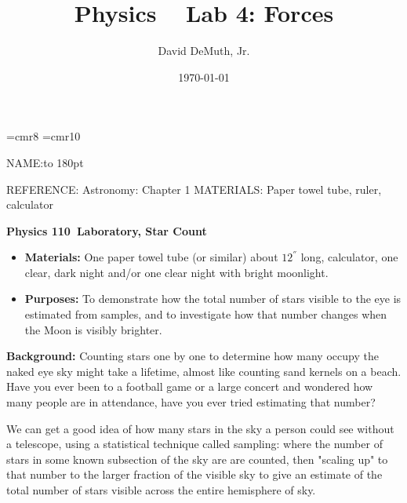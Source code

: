 \documentclass{article}
\title{\Huge Physics \courseno~ Lab 4: Forces}
\author{\Huge David DeMuth, Jr.}
\date{\today}
\def \courseno {110}
\begin{document}
\newcommand{\heading}[1]{{\boldbigtenrm #1}}
\newcommand{\subheading}[1]{{\boldtenrm #1}}
\newcommand{\referencepages}[1]{\vskip -25pt{\eightrm REFERENCE: #1}}
\newcommand{\materials}[1]{\vskip -15pt{\eightrm MATERIALS: #1}}
\font \eightrm=cmr8
\font \tenrm=cmr10
\def \normbs {\baselineskip 11pt}
\def \specbs {\baselineskip 14pt}
\def \nques#1#2{\normbs \medskip \smallitem {#1)} {#2} \specbs}
\def \nlist#1#2{\smallitem (\hskip 2pt) {#1)} \hskip 10pt {#2}\leftskip 0pt}
\def \version{\nopagenumbers \hbox to \hsize{\vbox to 0pt{\vskip-2.5pt \hfil {{\eightrm Physics 110 Version \today}}\hfil}}}
\thispagestyle{plain} %
\baselineskip 14pt

\def \headline{\hfill {NAME:\hbox to 180pt{\hrulefill}}}
\def \footline={20161206}
\def \setheadline#1{\footline{}\headline={\hfill {\eightrm #1 p. \folio}}}
\vskip -10pt  \headline

\parskip 8pt
\referencepages{Astronomy: Chapter 1}
\materials{Paper towel tube, ruler, calculator}

{\bf Physics \courseno~Laboratory, Star Count}
\vskip 0pt
\begin{itemize}[label={}]
  \item {\bf Materials:} One paper towel tube (or similar) about $12^{''}$ long, calculator, one clear, dark night and/or one clear night with bright moonlight.
  \item {\bf Purposes:} To demonstrate how the total number of stars visible to the eye is estimated from samples, and to investigate how that number changes when the Moon is visibly brighter.
\end{itemize}

{\bf Background:} Counting stars one by one to determine how many occupy the naked eye sky might take a lifetime, almost like counting sand kernels on a beach. Have you ever been to a football game or a large concert and wondered how many people are in attendance, have you ever tried estimating that number? 

We can get a good idea of how many stars in the sky a person could see without a telescope, using a statistical technique called sampling: where the number of stars in some known subsection of the sky are are counted, then "scaling up" to that number to the larger fraction of the visible sky to give an estimate of the total number of stars visible across the entire hemisphere of sky. %
\end{document}
